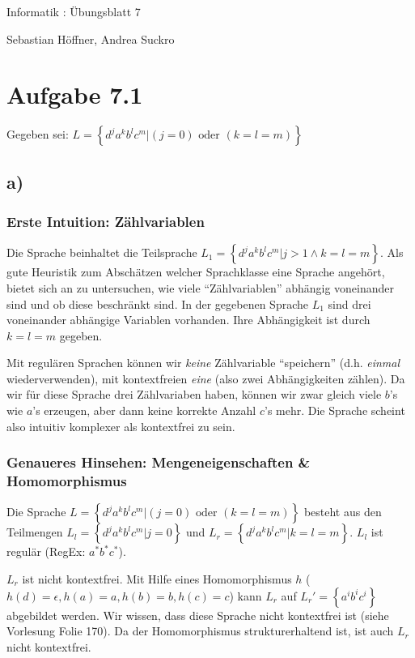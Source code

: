 \documentclass{article}
\begin{document}
\begin{center}
  \Large{Informatik \revD: Übungsblatt 7}

  \large{Sebastian Höffner, Andrea Suckro}
\end{center}



\section*{Aufgabe 7.1}
Gegeben sei: $L=\left\{d^ja^kb^lc^m | (j=0)\text{ oder }(k=l=m) \right\}$

\subsection*{a)}
\subsubsection*{Erste Intuition: Zählvariablen}
Die Sprache beinhaltet die Teilsprache $L_1=\left\{d^ja^kb^lc^m | j>1 \wedge k=l=m \right\}$. Als gute Heuristik zum Abschätzen welcher Sprachklasse eine Sprache angehört, bietet sich an zu untersuchen, wie viele "`Zählvariablen"' abhängig voneinander sind und ob diese beschränkt sind. In der gegebenen Sprache $L_1$ sind drei voneinander abhängige Variablen vorhanden. Ihre Abhängigkeit ist durch $k=l=m$ gegeben. 

Mit regulären Sprachen können wir \emph{keine} Zählvariable "`speichern"' (d.h. \emph{einmal} wiederverwenden), mit kontextfreien \emph{eine} (also zwei Abhängigkeiten zählen). Da wir für diese Sprache drei Zählvariaben haben, können wir zwar gleich viele $b$'s wie $a$'s erzeugen, aber dann keine korrekte Anzahl $c$'s mehr. Die Sprache scheint also intuitiv komplexer als kontextfrei zu sein.

\subsubsection*{Genaueres Hinsehen: Mengeneigenschaften \& Homomorphismus}
Die Sprache $L=\left\{d^ja^kb^lc^m | (j=0)\text{ oder }(k=l=m) \right\}$ besteht aus den Teilmengen $L_l=\left\{d^ja^kb^lc^m | j=0\right\}$ und $L_r=\left\{d^ja^kb^lc^m | k=l=m\right\}$. $L_l$ ist regulär (RegEx: $a^*b^*c^*$). 

$L_r$ ist nicht kontextfrei. Mit Hilfe eines Homomorphismus $h$ ($h(d)=\epsilon, h(a)=a, h(b)=b, h(c)=c$) kann $L_r$ auf $L_r'=\left\{a^ib^ic^i\right\}$ abgebildet werden. Wir wissen, dass diese Sprache nicht kontextfrei ist (siehe Vorlesung Folie 170). Da der Homomorphismus strukturerhaltend ist, ist auch $L_r$ nicht kontextfrei.
\end{document}
